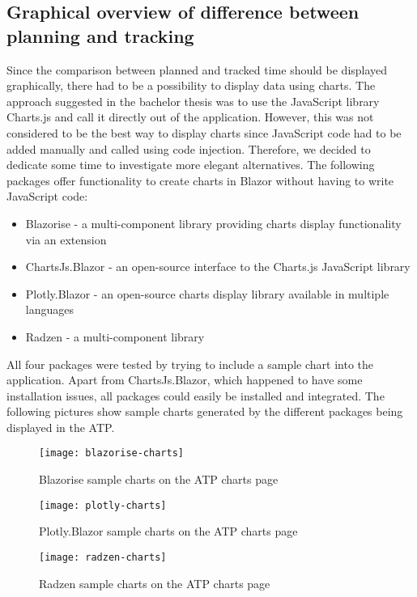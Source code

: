 \subsection{Graphical overview of difference between planning and tracking}
Since the comparison between planned and tracked time should be displayed graphically, there had to be a possibility to display data using charts. The approach suggested in the bachelor thesis was to use the JavaScript library Charts.js and call it directly out of the application. However, this was not considered to be the best way to display charts since JavaScript code had to be added manually and called using code injection. Therefore, we decided to dedicate some time to investigate more elegant alternatives. The following packages offer functionality to create charts in Blazor without having to write JavaScript code:
\begin{itemize}
	\item Blazorise \cite{blazorise-url} - a multi-component library providing charts display functionality via an extension
	\item ChartsJs.Blazor \cite{chartsjs.blazor-url} - an open-source interface to the Charts.js JavaScript library
	\item Plotly.Blazor \cite{plotly-url} - an open-source charts display library available in multiple languages
	\item Radzen \cite{radzen-url} - a multi-component library
\end{itemize}
All four packages were tested by trying to include a sample chart into the application. Apart from ChartsJs.Blazor, which happened to have some installation issues, all packages could easily be installed and integrated. The following pictures show sample charts generated by the different packages being displayed in the ATP.

\begin{figure}[H]
	\centering
	\texttt{[image: blazorise-charts]}
	\caption{Blazorise sample charts on the ATP charts page}
	\label{figure5}
\end{figure}

\begin{figure}[H]
	\centering
	\texttt{[image: plotly-charts]}
	\caption{Plotly.Blazor sample charts on the ATP charts page}
	\label{figure6}
\end{figure}

\begin{figure}[H]
	\centering
	\texttt{[image: radzen-charts]}
	\caption{Radzen sample charts on the ATP charts page}
	\label{figure7}
\end{figure}

